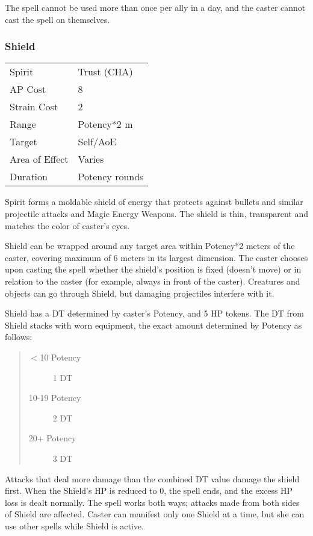 \documentclass[11pt,a4paper,twocolumn]{book}
\begin{document}
The spell cannot be used more than once per ally in a day, and the caster cannot cast the spell on themselves.



\subsubsection*{Shield}
{
	\begin{tabu} to 75mm{| X[l,4] | X[l,7] |}
		\hline
		Spirit 			& Trust (CHA) 		\\
		AP Cost	      	& 8 						\\
		Strain Cost     & 2 						\\
		Range     		& Potency*2	m				\\
		Target      	& Self/AoE					\\
		Area of Effect  & Varies  	 				\\
		Duration     	& Potency rounds			\\ \hline
	\end{tabu}
	
}

\medskip

Spirit forms a moldable shield of energy that protects against bullets and similar projectile attacks and Magic Energy Weapons. The shield is thin, transparent and matches the color of caster's eyes.

Shield can be wrapped around any target area within Potency*2 meters of the caster, covering maximum of 6 meters in its largest dimension. The caster chooses upon casting the spell whether the shield's position is fixed (doesn't move) or in relation to the caster (for example, always in front of the caster). Creatures and objects can go through Shield, but damaging projectiles interfere with it.

Shield has a DT determined by caster's Potency, and 5 HP tokens. The DT from Shield stacks with worn equipment, the exact amount determined by Potency as follows:
\begin{quote}
	\begin{description}
		\item[$<$10 Potency] 	1 DT
		\item[10-19 Potency]    2 DT
		\item[20+ Potency] 		3 DT
	\end{description}
\end{quote}

Attacks that deal more damage than the combined DT value damage the shield first. When the Shield's HP is reduced to 0, the spell ends, and the excess HP loss is dealt normally. The spell works both ways; attacks made from both sides of Shield are affected. Caster can manifest only one Shield at a time, but she can use other spells while Shield is active.
\end{document}
